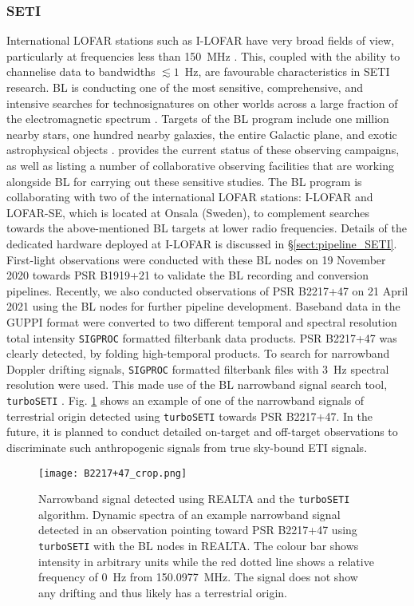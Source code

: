 \subsubsection{SETI}
International LOFAR stations such as I-LOFAR have very broad fields of view, particularly at frequencies less than 150~MHz \citep{VanHaarlem2013}. This, coupled with the ability to channelise data to bandwidths $\lesssim 1$~Hz, are favourable characteristics in SETI research.
BL is conducting one of the most sensitive, comprehensive, and intensive searches for technosignatures on other worlds across a large fraction of the electromagnetic spectrum \citep{Worden2017}. Targets of the BL program include one million nearby stars, one hundred nearby galaxies, the entire Galactic plane, and exotic astrophysical objects \citep[see][for detail]{Isaacson2017}. \cite{Gajjar2019} provides the current status of these observing campaigns, as well as listing a number of collaborative observing facilities that are working alongside BL for carrying out these sensitive studies. The BL program is collaborating with two of the international LOFAR stations: I-LOFAR and LOFAR-SE, which is located at Onsala (Sweden), to complement searches towards the above-mentioned BL targets at lower radio frequencies. Details of the dedicated hardware deployed at I-LOFAR is discussed in \S \ref{sect:pipeline_SETI}. First-light observations were conducted with these BL nodes on 19 November 2020 towards PSR B1919+21 to validate the BL recording and conversion pipelines.
Recently, we also conducted observations of PSR B2217+47 on 21 April 2021 using the BL nodes for further pipeline development. Baseband data in the GUPPI format were converted to two different temporal and spectral resolution total intensity \texttt{SIGPROC} formatted filterbank data products. PSR B2217+47 was clearly detected, by folding high-temporal products. To search for narrowband Doppler drifting signals, \texttt{SIGPROC} formatted filterbank files with 3~Hz spectral resolution were used. This made use of the BL narrowband signal search tool, \texttt{turboSETI} \citep{Enriquez2017}. Fig. \ref{fig:BL_fig} shows an example of one of the narrowband signals of terrestrial origin detected using \texttt{turboSETI} towards PSR B2217+47. In the future, it is planned to conduct detailed on-target and off-target observations to discriminate such anthropogenic signals from true sky-bound ETI signals. 


\begin{figure}
    \centering
    \texttt{[image: B2217+47\_crop.png]}
    \caption[Narrowband signal detected using REALTA and the \texttt{turboSETI} algorithm.]{Narrowband signal detected using REALTA and the \texttt{turboSETI} algorithm. Dynamic spectra of an example narrowband signal detected in an observation pointing toward PSR B2217+47 using \texttt{turboSETI} with the BL nodes in REALTA. The colour bar shows intensity in arbitrary units while the red dotted line shows a relative frequency of 0~Hz from 150.0977~MHz. The signal does not show any drifting and thus likely has a terrestrial origin.}
    \label{fig:BL_fig}
\end{figure}



